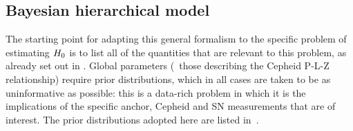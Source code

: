\documentclass[a4paper,fleqn,usenatbib]{mnras}
\begin{document}
{\subsection{Bayesian hierarchical model}

The starting point for adapting this general formalism to the specific problem of estimating $H_0$ is to list all of the quantities that are relevant to this problem, as already set out in .
Global parameters (\eg\ those describing the Cepheid P-L-Z relationship) require prior distributions, which in all cases are taken to be as uninformative as possible: this is a data-rich problem in which it is the implications of the specific anchor, Cepheid and SN measurements that are of interest. The prior distributions adopted here are listed in~.


}
\end{document}
